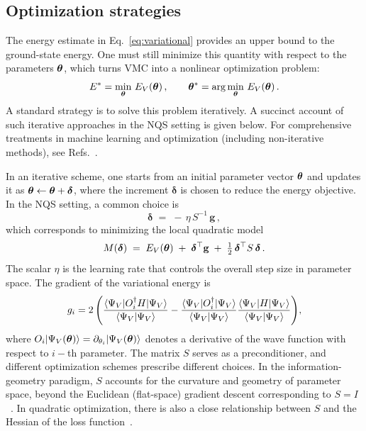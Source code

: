 \subsection{Optimization strategies}
\label{subsec:opt}
The energy estimate in Eq.~\eqref{eq:variational} provides an upper bound to the ground-state energy. One must still minimize this quantity with respect to the parameters $\boldsymbol{\theta}$, which turns VMC into a nonlinear optimization problem:
\begin{equation}
E^{*}=\min_{\boldsymbol{\theta}}\, E_V(\boldsymbol{\theta})\,, \qquad
\boldsymbol{\theta}^{*}=\arg\min_{\boldsymbol{\theta}}\, E_V(\boldsymbol{\theta})\, .
\end{equation}
A standard strategy is to solve this problem iteratively. A succinct account of such iterative approaches in the NQS setting is given below. For comprehensive treatments in machine learning and optimization (including non-iterative methods), see Refs.~\cite{nocedal_numerical_2006,amari_information_2016}. 


In an iterative scheme, one starts from an initial parameter vector $\boldsymbol{\theta}$ and updates it as
$\boldsymbol{\theta} \leftarrow \boldsymbol{\theta} + \boldsymbol{\delta}$, where the increment $\boldsymbol{\delta}$ is chosen to reduce the energy objective. In the NQS setting, a common choice is
\begin{equation}
\boldsymbol{\delta} \;=\; -\,\eta\, S^{-1}\, \mathbf{g} \,,
\label{eq:update_pars}
\end{equation}
which corresponds to minimizing the local quadratic model
\begin{equation}
M(\boldsymbol{\delta}) \;=\; E_V(\boldsymbol{\theta}) \;+\; \boldsymbol{\delta}^{\top} \mathbf{g} \;+\; \tfrac{1}{2}\, \boldsymbol{\delta}^{\top} S\, \boldsymbol{\delta}\,.
\label{eq:quadratic_sr}
\end{equation}
The scalar $\eta$ is the learning rate that controls the overall step size in parameter space. The gradient of the variational energy is
\begin{equation}
g_i
= 2 \left(
\frac{\braket{\Psi_V | O_i^\dagger H | \Psi_V}}{\braket{\Psi_V | \Psi_V}}
- \frac{\braket{\Psi_V | O_i^\dagger | \Psi_V}}{\braket{\Psi_V | \Psi_V}}
  \frac{\braket{\Psi_V | H | \Psi_V}}{\braket{\Psi_V | \Psi_V}}
\right)\!,
\label{eq:gradient}
\end{equation}
where $O_i|\Psi_V(\boldsymbol{\theta})\rangle = \partial_{\theta_i} |\Psi_V(\boldsymbol{\theta})\rangle$ denotes a derivative of the wave function with respect to $i-$th parameter. The matrix $S$ serves as a preconditioner, and different optimization schemes prescribe different choices. In the information-geometry paradigm, $S$ accounts for the curvature and geometry of parameter space, beyond the Euclidean (flat-space) gradient descent corresponding to $S=I$~\cite{amari_information_2016}. In quadratic optimization, there is also a close relationship between $S$ and the Hessian of the loss function~\cite{nocedal_numerical_2006}.


